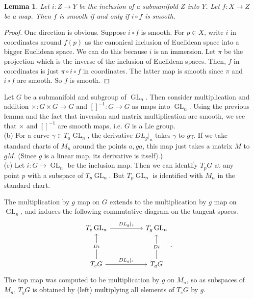 \documentclass{amsart}
\numberwithin{equation}{section}
\theoremstyle{plain}
\newtheorem{lemma}[theorem]{Lemma}
\theoremstyle{definition}
\theoremstyle{remark}
\renewcommand{\_}[2]{\underbrace{#1}_{#2}}
\renewcommand{\^}[2]{\overbrace{#1}_{#2}}
\newcommand{\GL}{\operatorname{GL}}
\begin{document}
\begin{lemma}
  Let $i:Z \to Y$ be the inclusion of a submanifold $Z$ into $Y$. Let $f:X \to Z$ be a map. Then $f$ is smooth if and only if $i\circ f$ is smooth.
\end{lemma}
\begin{proof}
  One direction is obvious. Suppose $i\circ f$ is smooth. For $p \in X$, write $i$ in coordinates around $f(p)$ as the canonical inclusion of Euclidean space into a bigger Euclidean space. We can do this because $i$ is an immersion. Let $\pi$ be the projection which is the inverse of the inclusion of Euclidean spaces. Then, $f$ in coordinates is just $\pi \circ i\circ f$ in coordinates. The latter map is smooth since $\pi$ and $i\circ f$ are smooth. So $f$ is smooth. 
\end{proof}

Let $G$ be a submanifold and subgroup of $\GL_n$. Then consider multiplication and addition $\times: G\times G\to G$ and $[]^{-1}: G\to G$ as maps into $\GL_n$. Using the previous lemma and the fact that inversion and matrix multiplication are smooth, we see that $\times$ and $[]^{-1}$ are smooth maps, i.e. $G$ is a Lie group.\\

(b) For a curve $\gamma \in T_a\GL_n$, the derivative $DL_g|_a$ takes $\gamma$ to $g \gamma$. If we take standard charts of $M_n$ around the points $a, ga$, this map just takes a matrix $M$ to $gM$. (Since $g$ is a linear map, its derivative is itself).)\\

(c) Let $i:G\to \GL_n$ be the inclusion map. Then we can identify $T_pG$ at any point $p$ with a subspace of $T_p\GL_n$. But $T_p\GL_n$ is identified with $M_n$ in the standard chart.

The multiplication by $g$ map on $G$ extends to the multiplication by $g$ map on $\GL_n$, and induces the following commutative diagram on the tangent spaces.
\[\begin{tikzcd}
	{T_e\GL_n} && {T_g\GL_n} \\
	\\
	{T_eG} && {T_gG}
	\arrow["{DL_g|_e}", from=1-1, to=1-3]
	\arrow["Di"{description}, from=3-1, to=1-1]
	\arrow["{DL_g|_e}", from=3-1, to=3-3]
	\arrow["Di"{description}, from=3-3, to=1-3]
      \end{tikzcd}.\]
The top map was computed to be multiplication by $g$ on $M_n$, so as subspaces of $M_n$, $T_gG$ is obtained by (left) multiplying all elements of $T_eG$ by $g$.\\
\end{document}
